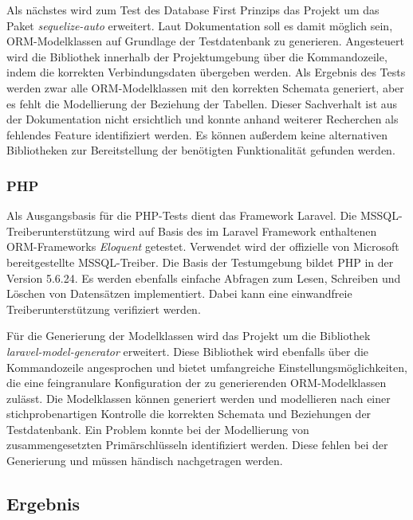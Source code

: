 Als nächstes wird zum Test des Database First Prinzips das Projekt um das Paket \emph{sequelize-auto} erweitert. Laut Dokumentation soll es damit möglich sein, ORM-Modelklassen auf Grundlage der Testdatenbank zu generieren. Angesteuert wird die Bibliothek innerhalb der Projektumgebung über die Kommandozeile, indem die korrekten Verbindungsdaten übergeben werden. Als Ergebnis des Tests werden zwar alle ORM-Modelklassen mit den korrekten Schemata generiert, aber es fehlt die Modellierung der Beziehung der Tabellen. Dieser Sachverhalt ist aus der Dokumentation nicht ersichtlich und konnte anhand weiterer Recherchen als fehlendes Feature identifiziert werden. Es können außerdem keine alternativen Bibliotheken zur Bereitstellung der benötigten Funktionalität gefunden werden.

\subsubsection{PHP}

Als Ausgangsbasis für die PHP-Tests dient das Framework Laravel. Die MSSQL-Treiberunterstützung wird auf Basis des im Laravel Framework enthaltenen ORM-Frameworks \emph{Eloquent} getestet. Verwendet wird der offizielle von Microsoft bereitgestellte MSSQL-Treiber. Die Basis der Testumgebung bildet PHP in der Version 5.6.24. Es werden ebenfalls einfache Abfragen zum Lesen, Schreiben und Löschen von Datensätzen implementiert. Dabei kann eine einwandfreie Treiberunterstützung verifiziert werden.

Für die Generierung der Modelklassen wird das Projekt um die Bibliothek \emph{laravel-model-generator} erweitert. Diese Bibliothek wird ebenfalls über die Kommandozeile angesprochen und bietet umfangreiche Einstellungsmöglichkeiten, die eine feingranulare Konfiguration der zu generierenden ORM-Modelklassen zulässt. Die Modelklassen können generiert werden und modellieren nach einer stichprobenartigen Kontrolle die korrekten Schemata und Beziehungen der Testdatenbank. Ein Problem konnte bei der Modellierung von zusammengesetzten Primärschlüsseln identifiziert werden. Diese fehlen bei der Generierung und müssen händisch nachgetragen werden.

\subsection{Ergebnis}

